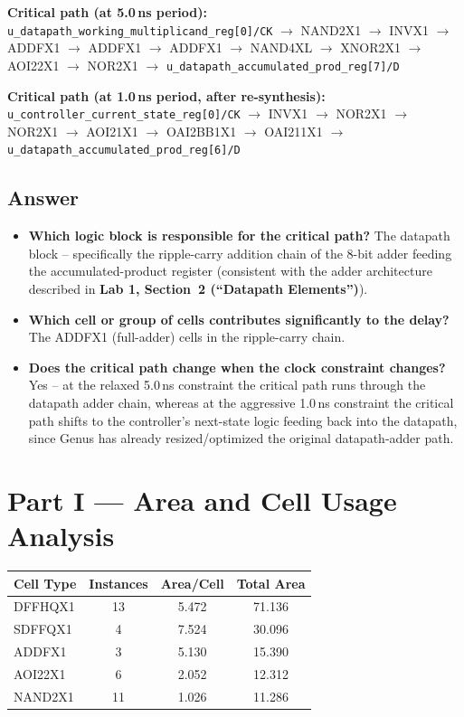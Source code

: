 \documentclass[11pt]{article}
\newcommand{\lab}[1]{\textbf{Lab 1, Section~#1}}
\begin{document}
\noindent\textbf{Critical path (at 5.0\,ns period):}\\
\texttt{u\_datapath\_working\_multiplicand\_reg[0]/CK} $\rightarrow$ NAND2X1 $\rightarrow$ INVX1
$\rightarrow$ ADDFX1 $\rightarrow$ ADDFX1 $\rightarrow$ ADDFX1 $\rightarrow$ NAND4XL $\rightarrow$
XNOR2X1 $\rightarrow$ AOI22X1 $\rightarrow$ NOR2X1 $\rightarrow$
\texttt{u\_datapath\_accumulated\_prod\_reg[7]/D}

\noindent\textbf{Critical path (at 1.0\,ns period, after re-synthesis):}\\
\texttt{u\_controller\_current\_state\_reg[0]/CK} $\rightarrow$ INVX1 $\rightarrow$ NOR2X1
$\rightarrow$ NOR2X1 $\rightarrow$ AOI21X1 $\rightarrow$ OAI2BB1X1 $\rightarrow$ OAI211X1
$\rightarrow$ \texttt{u\_datapath\_accumulated\_prod\_reg[6]/D}

\subsection*{Answer}
\begin{itemize}
    \item \textbf{Which logic block is responsible for the critical path?} The datapath block --
    specifically the ripple-carry addition chain of the 8-bit adder feeding the accumulated-product
    register (consistent with the adder architecture described in \lab{2 (``Datapath
    Elements'')}).
    \item \textbf{Which cell or group of cells contributes significantly to the delay?} The ADDFX1
    (full-adder) cells in the ripple-carry chain.
    \item \textbf{Does the critical path change when the clock constraint changes?} Yes -- at the
    relaxed 5.0\,ns constraint the critical path runs through the datapath adder chain, whereas at
    the aggressive 1.0\,ns constraint the critical path shifts to the controller's next-state logic
    feeding back into the datapath, since Genus has already resized/optimized the original
    datapath-adder path.
\end{itemize}

\section{Part I --- Area and Cell Usage Analysis}
\begin{center}
\begin{tabular}{|l|c|c|c|}
\hline
\textbf{Cell Type} & \textbf{Instances} & \textbf{Area/Cell} & \textbf{Total Area} \\ \hline
DFFHQX1  & 13 & 5.472 & 71.136 \\ \hline
SDFFQX1  & 4  & 7.524 & 30.096 \\ \hline
ADDFX1   & 3  & 5.130 & 15.390 \\ \hline
AOI22X1  & 6  & 2.052 & 12.312 \\ \hline
NAND2X1  & 11 & 1.026 & 11.286 \\ \hline
\end{tabular}
\end{center}
\end{document}
